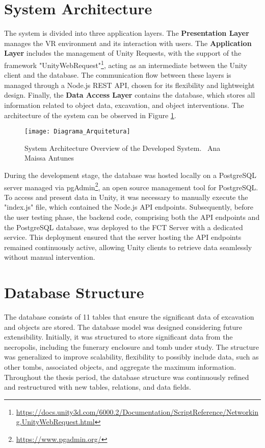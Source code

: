 \section{System Architecture}
\label{sec:architecture}

The system is divided into three application layers.
The \textbf{Presentation Layer} manages the \gls{VR} environment and its interaction with users. The \textbf{Application Layer} includes the management of Unity Requests, with the support of the framework "UnityWebRequest"\footnote{\url{https://docs.unity3d.com/6000.2/Documentation/ScriptReference/Networking.UnityWebRequest.html}}, acting as an intermediate between the Unity client and the database. 
The communication flow between these layers is managed through a Node.js \gls{REST} \gls{API}, chosen for its flexibility and lightweight design. 
Finally, the \textbf{Data Access Layer} contains the database, which stores all information related to object data, excavation, and object interventions. 
The architecture of the system can be observed in Figure \ref{fig:architecture}.
\begin{figure}[h!]
    \centering
    \texttt{[image: Diagrama\_Arquitetura]}
    \caption{System Architecture Overview of the Developed System. \textcopyright\ Ana Maissa Antunes}
    \label{fig:architecture}
\end{figure}

During the development stage, the database was hosted locally on a PostgreSQL server managed via pgAdmin\footnote{\url{https://www.pgadmin.org/}}, an open source management tool for PostgreSQL. To access and present data in Unity, it was necessary to manually execute the "index.js" file, which contained the Node.js API endpoints.
Subsequently, before the user testing phase, the backend code, comprising both the \gls{API} endpoints and the PostgreSQL database, was deployed to the \gls{FCT} Server with a dedicated service.
This deployment ensured that the server hosting the \gls{API} endpoints remained continuously active, allowing Unity clients to retrieve data seamlessly without manual intervention.


\section{Database Structure}
\label{sec:database}

The database consists of 11 tables that ensure the significant data of excavation and objects are stored. %
The database model was designed considering future extensibility. Initially, it was structured to store significant data from the necropolis, including the funerary enclosure and tomb under study. The structure was generalized to improve scalability, flexibility to possibly include data, such as other tombs, associated objects, and aggregate the maximum information. 
Throughout the thesis period, the database structure was continuously refined and restructured with new tables, relations, and data fields.

